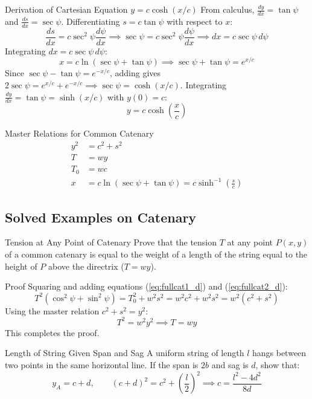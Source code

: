 \documentclass[11pt,a4paper]{article}
\begin{document}
\begin{proofbox}{Derivation of Cartesian Equation $y = c \cosh(x/c)$}
From calculus, $\frac{dy}{dx} = \tan\psi$ and $\frac{ds}{dx} = \sec\psi$.
Differentiating $s = c \tan\psi$ with respect to $x$:
\[
\frac{ds}{dx} = c \sec^2\psi \frac{d\psi}{dx} \implies \sec\psi = c \sec^2\psi \frac{d\psi}{dx} \implies dx = c \sec\psi \, d\psi
\]
Integrating $dx = c \sec\psi \, d\psi$:
\[
x = c \ln(\sec\psi + \tan\psi) \implies \sec\psi + \tan\psi = e^{x/c}
\]
Since $\sec\psi - \tan\psi = e^{-x/c}$, adding gives $2\sec\psi = e^{x/c} + e^{-x/c} \implies \sec\psi = \cosh(x/c)$.
Integrating $\frac{dy}{dx} = \tan\psi = \sinh(x/c)$ with $y(0) = c$:
\begin{equation}
y = c \cosh\left(\frac{x}{c}\right)
\end{equation}
\end{proofbox}

\begin{importantbox}{Master Relations for Common Catenary}
\begin{align}
y^2 &= c^2 + s^2 \\
T &= w y \\
T_0 &= w c \\
x &= c \ln(\sec\psi + \tan\psi) = c \sinh^{-1}\left(\frac{s}{c}\right)
\end{align}
\end{importantbox}

\subsection{Solved Examples on Catenary}

\begin{examplebox}{Tension at Any Point of Catenary}
Prove that the tension $T$ at any point $P(x,y)$ of a common catenary is equal to the weight of a length of the string equal to the height of $P$ above the directrix ($T = wy$).
\end{examplebox}

\begin{proofbox}{Proof}
Squaring and adding equations (\ref{eq:fullcat1_d}) and (\ref{eq:fullcat2_d}):
\[
T^2 (\cos^2\psi + \sin^2\psi) = T_0^2 + w^2 s^2 = w^2 c^2 + w^2 s^2 = w^2 (c^2 + s^2)
\]
Using the master relation $c^2 + s^2 = y^2$:
\[
T^2 = w^2 y^2 \implies T = w y
\]
This completes the proof.
\end{proofbox}

\begin{examplebox}{Length of String Given Span and Sag}
A uniform string of length $l$ hangs between two points in the same horizontal line. If the span is $2b$ and sag is $d$, show that:
\begin{equation}
y_A = c + d, \qquad (c+d)^2 = c^2 + \left(\frac{l}{2}\right)^2 \implies c = \frac{l^2 - 4d^2}{8d}
\end{equation}
\end{examplebox}
\end{document}
